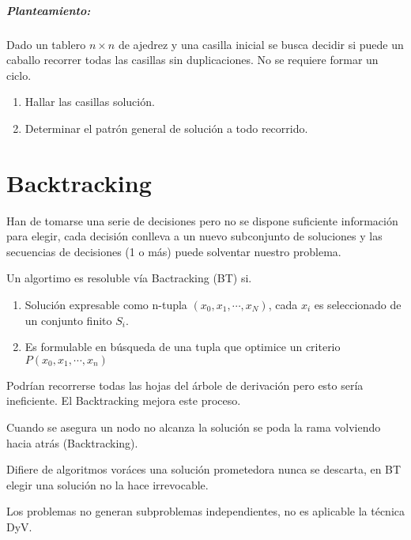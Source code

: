 \documentclass[tikz,11pt,fleqn]{book} %
\begin{document}
\begin{example}
	\paragraph{Planteamiento:}
	\begin{definition}
		Dado un tablero $n\times n$ de ajedrez y una casilla inicial se busca decidir si puede un caballo recorrer todas las casillas sin duplicaciones. No se requiere formar un ciclo.
		\begin{enumerate}
			\item Hallar las casillas solución.
			\item Determinar el patrón general de solución a todo recorrido.
		\end{enumerate}
	\end{definition}
\end{example}

\chapter{Backtracking}
Han de tomarse una serie de decisiones pero no se dispone suficiente información para elegir, cada decisión conlleva a un nuevo subconjunto de soluciones y las secuencias de decisiones (1 o más) puede solventar nuestro problema.

\begin{theorem}[Caracterización]
	Un algortimo es resoluble vía Bactracking (BT) si.
	\begin{enumerate}
		\item Solución expresable como n-tupla $(x_0, x_1, \cdots,x_N)$, cada $x_i$ es seleccionado de un conjunto finito $S_i$.
		\item Es formulable en búsqueda de una tupla que optimice un criterio $P(x_0, x_1, \cdots,x_n)$
	\end{enumerate}
	Podrían recorrerse todas las hojas del árbole de derivación pero esto sería ineficiente. El Backtracking mejora este proceso.

	Cuando se asegura un nodo no alcanza la solución se poda la rama volviendo hacia atrás (Backtracking).

	Difiere de algoritmos voráces una solución prometedora nunca se descarta, en BT elegir una solución no la hace irrevocable.

	Los problemas no generan subproblemas independientes, no es aplicable la técnica DyV.
\end{theorem}
\end{document}

